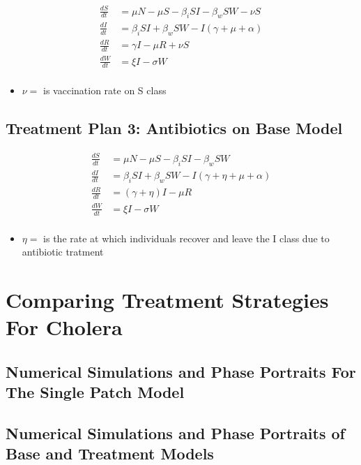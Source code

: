 \documentclass[12pt]{article}\usepackage[]{graphicx}\usepackage[]{color}
\begin{document}
\begin{linenomath}
\begin{align*}
	\frac{dS}{dt}&= \mu N - \mu S - \beta_i SI - \beta_w S W - \nu S \\
	\frac{dI}{dt}&= \beta_i S I + \beta_w S W - I (\gamma + \mu + \alpha) \\
	\frac{dR}{dt}&= \gamma I - \mu R + \nu S\\
	\frac{dW}{dt}&= \xi I  - \sigma W\\
\end{align*}
\end{linenomath}

\begin{itemize}
	\item $\nu=$ is vaccination rate on S class
\end{itemize}

\subsection{Treatment Plan 3: Antibiotics on Base Model}

\begin{linenomath}
\begin{align*}
	\frac{dS}{dt}&= \mu N - \mu S - \beta_i SI - \beta_w S W \\
	\frac{dI}{dt}&= \beta_i S I + \beta_w S W - I (\gamma +\eta + \mu + \alpha ) \\
	\frac{dR}{dt}&= (\gamma +\eta)I - \mu R \\
	\frac{dW}{dt}&= \xi I  - \sigma W\\
\end{align*}
\end{linenomath}
\begin{itemize}
	\item $\eta=$ is the rate at which individuals recover and leave the I class due to antibiotic tratment
\end{itemize}

\section{Comparing Treatment Strategies For Cholera}
\subsection{Numerical Simulations and Phase Portraits For The Single Patch Model}


\subsection{Numerical Simulations and Phase Portraits of Base and Treatment Models}
\end{document}
